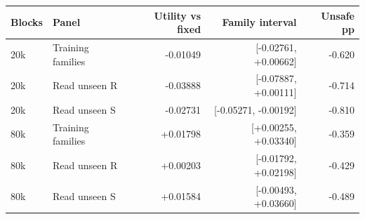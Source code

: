 \begin{tabular}{llrrr}
\toprule
Blocks & Panel & Utility vs fixed & Family interval & Unsafe pp \\
\midrule
20k & Training families & -0.01049 & [-0.02761, +0.00662] & -0.620 \\
20k & Read unseen R & -0.03888 & [-0.07887, +0.00111] & -0.714 \\
20k & Read unseen S & -0.02731 & [-0.05271, -0.00192] & -0.810 \\
80k & Training families & +0.01798 & [+0.00255, +0.03340] & -0.359 \\
80k & Read unseen R & +0.00203 & [-0.01792, +0.02198] & -0.429 \\
80k & Read unseen S & +0.01584 & [-0.00493, +0.03660] & -0.489 \\
\bottomrule
\end{tabular}
